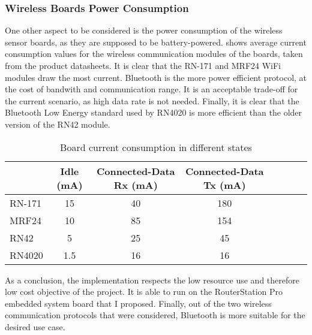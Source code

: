 \subsubsection{Wireless Boards Power Consumption} 

One other aspect to be considered is the power consumption of the wireless sensor boards, as they are supposed to be battery-powered.  shows average current consumption values for the wireless communication modules of the boards, taken from the product datasheets. It is clear that the RN-171 and MRF24 WiFi modules draw the most current. Bluetooth is the more power efficient protocol, at the cost of bandwith and communication range. It is an acceptable trade-off for the current scenario, as high data rate is not needed. Finally, it is clear that the Bluetooth Low Energy standard used by RN4020 is more efficient than the older version of the RN42 module.

\begin{center}
\begin{table}[htb]
  \begin{tabular}{l*{6}{c}r}
    & Idle (mA) & Connected-Data Rx (mA) & Connected-Data Tx (mA) \\
    \hline
    RN-171 & 15 & 40 & 180 \\
    MRF24 & 10 & 85 & 154 \\
    RN42 &  5 & 25 & 45 \\
    RN4020 & 1.5 & 16 & 16 \\
  \end{tabular}
  \caption{Board current consumption in different states}
  \label{table:reports}  
\end{table}
\end{center}

As a conclusion, the implementation respects the low resource use and therefore low cost objective of the project. It is able to run on the RouterStation Pro embedded system board that I proposed. Finally, out of the two wireless communication protocols that were considered, Bluetooth is more suitable for the desired use case.